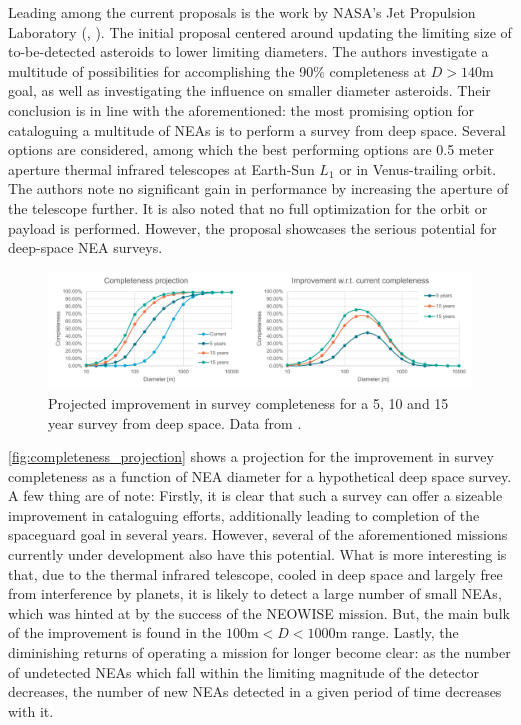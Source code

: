 Leading among the current proposals is the work by NASA's Jet Propulsion Laboratory (\cite{2003NEOSDT}, \cite{2017NEOSDT}). The initial proposal centered around updating the limiting size of to-be-detected asteroids to lower limiting diameters. The authors investigate a multitude of possibilities for accomplishing the 90\% completeness at $D > 140 \mathrm{m}$ goal, as well as investigating the influence on smaller diameter asteroids. Their conclusion is in line with the aforementioned: the most promising option for cataloguing a multitude of NEAs is to perform a survey from deep space. Several options are considered, among which the best performing options are 0.5 meter aperture thermal infrared telescopes at Earth-Sun $L_1$ or in Venus-trailing orbit. The authors note no significant gain in performance by increasing the aperture of the telescope further. It is also noted that no full optimization for the orbit or payload is performed. However, the proposal showcases the serious potential for deep-space NEA surveys. \\

\begin{figure}[htbp]
 \centering
 \includegraphics[width=1.0\textwidth]{img/completeness_projection.pdf}
 \caption{Projected improvement in survey completeness for a 5, 10 and 15 year survey from deep space. Data from \cite{2017NEOSDT}.}
 \label{fig:completeness_projection}
\end{figure}

\autoref{fig:completeness_projection} shows a projection for the improvement in survey completeness as a function of NEA diameter for a hypothetical deep space survey. A few thing are of note: Firstly, it is clear that such a survey can offer a sizeable improvement in cataloguing efforts, additionally leading to completion of the spaceguard goal in several years. However, several of the aforementioned missions currently under development also have this potential. What is more interesting is that, due to the thermal infrared telescope, cooled in deep space and largely free from interference by planets, it is likely to detect a large number of small NEAs, which was hinted at by the success of the NEOWISE mission. But, the main bulk of the improvement is found in the $100 \mathrm{m} < D < 1000 \mathrm{m}$ range. Lastly, the diminishing returns of operating a mission for longer become clear: as the number of undetected NEAs which fall within the limiting magnitude of the detector decreases, the number of new NEAs detected in a given period of time decreases with it. \\

